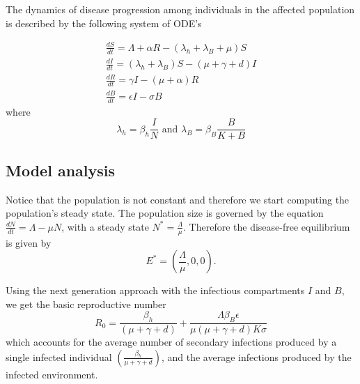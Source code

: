 \documentclass{book}\usepackage[]{graphicx}\usepackage[]{color}
\begin{document}
The dynamics of disease progression among individuals in the affected population is described by the following system of ODE's

\begin{equation}
\begin{array}{l}
\frac{d S}{d t}=\Lambda+\alpha R-\left(\lambda_{h}+\lambda_{B}+\mu\right) S \\
\frac{d I}{d t}=\left(\lambda_{h}+\lambda_{B}\right) S-(\mu+\gamma+d) I \\
\frac{d R}{d t}=\gamma I-(\mu+\alpha) R \\
\frac{d B}{d t}=\epsilon I-\sigma B
\end{array}
\end{equation}
where
\begin{equation}
\lambda_{h} =\beta_{h}\frac{I}{N} \text { and } \lambda_{B} =\beta_{B}\frac{B}{K+B}
\end{equation}

\subsection*{Model analysis}
Notice that the population is not constant and therefore we start computing the population's steady state. The population size is governed by the equation
$\frac{dN}{dt}=\Lambda -\mu N$,
with a steady state $N^*=\frac{\Lambda}{\mu}$.
Therefore the disease-free equilibrium is given by 
\begin{equation}
E^*=\left(\frac{\Lambda}{\mu},0,0 \right).
\end{equation}

Using the next generation approach with the infectious compartments $I$ and $B$, we get the basic reproductive number
\begin{equation}
R_{0}=\frac{\beta_{h}}{(\mu+\gamma+d)}+\frac{\Lambda \beta_{B} \epsilon}{\mu(\mu+\gamma+d) K \sigma}
\end{equation}
which accounts for the average number of secondary infections produced by a single infected individual $\left( \frac{\beta_{h}}{\mu+\gamma+d} \right)$, and the average infections produced by the infected environment.
\end{document}
